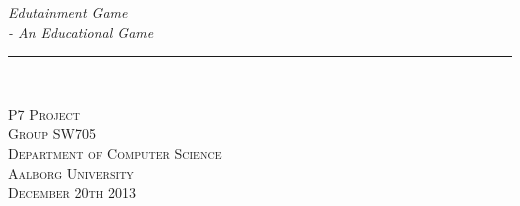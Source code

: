 \thispagestyle{empty}
\begin{flushright}
\vspace{3cm}

\phantom{hul}

\phantom{hul}

\phantom{hul}

\textsl{\Huge Edutainment Game}\\ \vspace{0.3cm}
\textsl{\Huge - An Educational Game} \vspace{0.5cm}

\rule{13cm}{3mm} \\ \vspace{1.5cm}
\vspace{1cm}


\vspace{1.5cm} 
\textsc{\Large P7 Project \\
Group SW705 \\
Department of Computer Science\\
Aalborg University\\
December 20th 2013\\}
\end{flushright}
